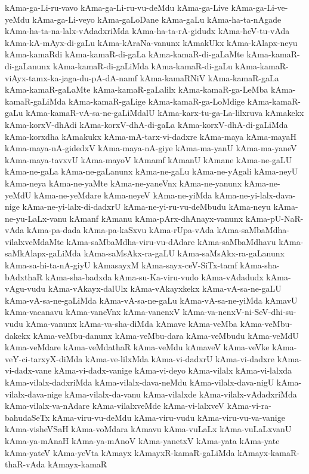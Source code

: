 {kAma-ga-Li-ru-vavo
kAma-ga-Li-ru-vu-deMdu
kAma-ga-Live
kAma-ga-Li-ve-yeMdu
kAma-ga-Li-veyo
kAma-gaLoDane
kAma-gaLu
kAma-ha-ta-nAgade
kAma-ha-ta-na-lalx-vAdadxriMda
kAma-ha-ta-rA-gidudx
kAma-heV-tu-vAda
kAma-kA-mAyx-di-gaLu
kAma-kAraNa-vanunx
kAmakUkx
kAma-kAlapx-neyu
kAma-kamaRdi
kAma-kamaR-di-gaLa
kAma-kamaR-di-gaLaMte
kAma-kamaR-di-gaLanunx
kAma-kamaR-di-gaLiMda
kAma-kamaR-di-gaLu
kAma-kamaR-viAyx-tamx-ka-jaga-du-pA-dA-namf
kAma-kamaRNiV
kAma-kamaR-gaLa
kAma-kamaR-gaLaMte
kAma-kamaR-gaLalilx
kAma-kamaR-ga-LeMba
kAma-kamaR-gaLiMda
kAma-kamaR-gaLige
kAma-kamaR-ga-LoMdige
kAma-kamaR-gaLu
kAma-kamaR-vA-sa-ne-gaLiMdalU
kAma-karx-tu-ga-La-lilxruva
kAmakekx
kAma-korxV-dhAdi
kAma-korxV-dhA-di-gaLa
kAma-korxV-dhA-di-gaLiMda
kAma-korxdha
kAmakukx
kAma-mA-tarx-vi-dadxre
kAma-maya
kAma-mayaH
kAma-maya-nA-gidedxV
kAma-maya-nA-giye
kAma-ma-yanU
kAma-ma-yaneV
kAma-maya-tavxvU
kAma-mayoV
kAmamf
kAmanU
kAmane
kAma-ne-gaLU
kAma-ne-gaLa
kAma-ne-gaLanunx
kAma-ne-gaLu
kAma-ne-yAgali
kAma-neyU
kAma-neya
kAma-ne-yaMte
kAma-ne-yaneVnx
kAma-ne-yanunx
kAma-ne-yeMdU
kAma-ne-yeMdare
kAma-neyeV
kAma-ne-yiMda
kAma-ne-yi-lalx-dava-nige
kAma-ne-yi-lalx-di-dadxrU
kAma-ne-yi-ru-vu-deMbudu
kAma-neyu
kAma-ne-yu-LaLx-vanu
kAmanf
kAmanu
kAma-pArx-dhAnayx-vanunx
kAma-pU-NaR-vAda
kAma-pa-dada
kAma-pa-kaSxvu
kAma-rUpa-vAda
kAma-saMbaMdha-vilalxveMdaMte
kAma-saMbaMdha-viru-vu-dAdare
kAma-saMbaMdhavu
kAma-saMkAlapx-gaLiMda
kAma-saMsAkx-ra-gaLU
kAma-saMsAkx-ra-gaLanunx
kAma-sa-hi-ta-nA-giyU
kAmasayxM
kAma-sayx-ceV-SiTx-tamf
kAma-sha-bAdxthaR
kAma-sha-badxda
kAma-su-Ka-viru-vudo
kAma-vAdadudx
kAma-vAgu-vudu
kAma-vAkayx-dalUlx
kAma-vAkayxkekx
kAma-vA-sa-ne-gaLU
kAma-vA-sa-ne-gaLiMda
kAma-vA-sa-ne-gaLu
kAma-vA-sa-ne-yiMda
kAmavU
kAma-vacanavu
kAma-vaneVnx
kAma-vanenxV
kAma-va-nenxV-ni-SeV-dhi-su-vudu
kAma-vanunx
kAma-va-sha-diMda
kAmave
kAma-veMba
kAma-veMbu-dakekx
kAma-veMbu-danunx
kAma-veMbu-dara
kAma-veMbudu
kAma-veMdU
kAma-veMdare
kAma-veMdathaR
kAma-veMdu
kAmaveV
kAma-veVke
kAma-veY-ci-tarxyX-diMda
kAma-ve-lilxMda
kAma-vi-dadxrU
kAma-vi-dadxre
kAma-vi-dadx-vane
kAma-vi-dadx-vanige
kAma-vi-deyo
kAma-vilalx
kAma-vi-lalxda
kAma-vilalx-dadxriMda
kAma-vilalx-dava-neMdu
kAma-vilalx-dava-nigU
kAma-vilalx-dava-nige
kAma-vilalx-da-vanu
kAma-vilalxde
kAma-vilalx-vAdadxriMda
kAma-vilalx-va-nAdare
kAma-vilalxveMde
kAma-vi-lalxveV
kAma-vi-ra-bahudaSeTx
kAma-viru-vu-deMdu
kAma-viru-vudu
kAma-viru-vu-va-vanige
kAma-visheVSaH
kAma-voMdara
kAmavu
kAma-vuLaLx
kAma-vuLaLxvanU
kAma-ya-mAnaH
kAma-ya-mAnoV
kAma-yanetxV
kAma-yata
kAma-yate
kAma-yateV
kAma-yeVta
kAmayx
kAmayxR-kamaR-gaLiMda
kAmayx-kamaR-thaR-vAda
kAmayx-kamaR
}

